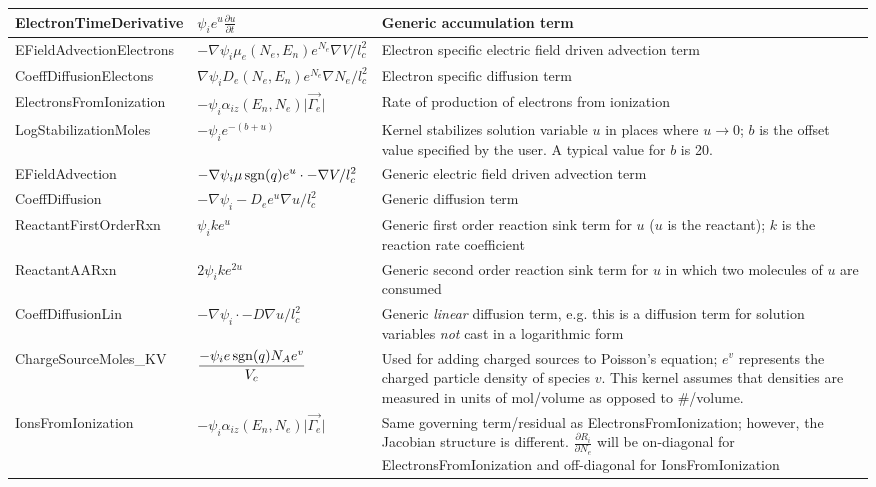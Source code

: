 \begin{ThreePartTable}
\begin{longtable}{>{\centering}m{2.25in}| >{\centering}m{1.75in}| >{\raggedright\arraybackslash}m{1.5in}}
    ElectronTimeDerivative & \(\displaystyle \psi_i e^u\frac{\partial u}{\partial t}\) & Generic accumulation term\\\hline
    EFieldAdvectionElectrons & \(\displaystyle -\nabla\psi_i \mu_e(N_e,E_n) e^{N_e}\nabla V /l_c^2\) & Electron specific electric field driven advection term\\\hline
    CoeffDiffusionElectons & \(\displaystyle \nabla\psi_i D_e(N_e,E_n) e^{N_e} \nabla N_e /l_c^2\) & Electron specific diffusion term\\\hline
    ElectronsFromIonization & \(\displaystyle -\psi_i \alpha_{iz}(E_n,N_e) \lvert\vec{\Gamma_e}\rvert\) & Rate of production of electrons from ionization\\\hline
    LogStabilizationMoles & \(\displaystyle -\psi_i e^{-(b+u)}\) & Kernel stabilizes solution variable $u$ in places where $u\rightarrow 0$; $b$ is the offset value specified by the user. A typical value for $b$ is 20.\\\hline
    EFieldAdvection & \(\displaystyle -\nabla \psi_i \mu\operatorname{sgn}(q) e^u \cdot -\nabla V /l_c^2\) & Generic electric field driven advection term\\\hline
    CoeffDiffusion & \(\displaystyle -\nabla \psi_i -D_e e^u \nabla u /l_c^2\) & Generic diffusion term\\\hline
    ReactantFirstOrderRxn & \(\displaystyle \psi_i k e^u\) & Generic first order reaction sink term for $u$ ($u$ is the reactant); $k$ is the reaction rate coefficient\\\hline
    ReactantAARxn & \(\displaystyle 2 \psi_i k e^{2u}\) & Generic second order reaction sink term for $u$ in which two molecules of $u$ are consumed\\\hline
    CoeffDiffusionLin & \(\displaystyle -\nabla \psi_i \cdot -D \nabla u /l_c^2\) & Generic \textit{linear} diffusion term, e.g. this is a diffusion term for solution variables \textit{not} cast in a logarithmic form\\\hline
    ChargeSourceMoles\_KV & \(\displaystyle \frac{-\psi_i e \operatorname{sgn}(q) N_A e^v}{V_c}\) & Used for adding charged sources to Poisson's equation; $e^v$ represents the charged particle density of species $v$. This kernel assumes that densities are measured in units of mol/volume as opposed to \#/volume.\\\hline
    IonsFromIonization & \(\displaystyle -\psi_i \alpha_{iz}(E_n,N_e) \lvert\vec{\Gamma_e}\rvert\) & Same governing term/residual as ElectronsFromIonization; however, the Jacobian structure is different. $\frac{\partial R_i}{\partial N_e}$ will be on-diagonal for ElectronsFromIonization and off-diagonal for IonsFromIonization\\\hline

\end{longtable}
\end{ThreePartTable}
